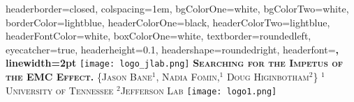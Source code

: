 \documentclass[landscape,a0paper,fontscale=0.285]{baposter} %
\begin{document}
\begin{poster}
{
headerborder=closed, %
colspacing=1em, %
bgColorOne=white, %
bgColorTwo=white, %
borderColor=lightblue, %
headerColorOne=black, %
headerColorTwo=lightblue, %
headerFontColor=white, %
boxColorOne=white, %
textborder=roundedleft, %
eyecatcher=true, %
headerheight=0.1\textheight, %
headershape=roundedright, %
headerfont=\Large\bf\textsc, %
linewidth=2pt %
}
%
{\texttt{[image: logo\_jlab.png]}}
{\bf\textsc{Searching for the Impetus of the EMC Effect.}\vspace{0.5em}} %
{\textsc{\{Jason Bane$^1$, Nadia Fomin,$^1$ Doug Higinbotham$^2$\} \hspace{12pt} \small{$^1$University of Tennessee $^2$Jefferson Lab}}} %
{\texttt{[image: logo1.png]}} %





\end{poster}
\end{document}

